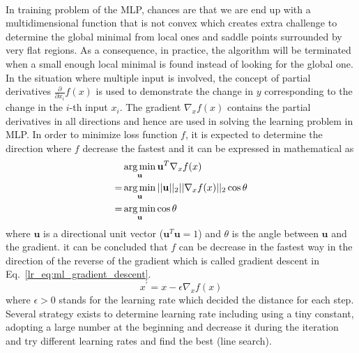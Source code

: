 \paragraph{}
In training problem of the MLP, chances are that we are end up with a multidimensional function that is not convex which creates extra challenge to determine the global minimal from local ones and saddle points surrounded by very flat regions.
As a consequence, in practice, the algorithm will be terminated when a small enough local minimal is found instead of looking for the global one.
In the situation where multiple input is involved, the concept of partial derivatives $\frac{\partial}{\partial x_i}f(x)$ is used to demonstrate the change in $y$ corresponding to the change in the $i$-th input $x_i$.
The gradient $\nabla_x f(x)$ contains the partial derivatives in all directions and hence are used in solving the learning problem in MLP.
In order to minimize loss function $f$, it is expected to determine the direction where $f$ decrease the fastest and it can be expressed in mathematical as
\begin{equation}
    \begin{aligned}
    & \operatorname*{arg\,min}_{\mathbf{u}} \mathbf{u}^T \nabla_x f(x)\\
    = & \operatorname*{arg\,min}_{\mathbf{u}} || \mathbf{u} ||_2 ||\nabla_xf(x)||_2 \cos\theta \\
    = & \operatorname*{arg\,min}_{\mathbf{u}} \cos\theta
    \end{aligned}
\end{equation}
%
where $\mathbf{u}$ is a directional unit vector ($\mathbf{u}^T\mathbf{u}=1$) and $\theta$ is the angle between $\mathbf{u}$ and the gradient.
it can be concluded that $f$ can be decrease in the fastest way in the direction of the reverse of the gradient which is called gradient descent in Eq.~\ref{lr_eq:ml_gradient_descent}.
\begin{equation}
    x^\prime = x - \epsilon \nabla_x f(x)
    \label{lr_eq:ml_gradient_descent}
\end{equation}
%
where $\epsilon > 0$ stands for the learning rate which decided the distance for each step.
Several strategy exists to determine learning rate including using a tiny constant, adopting a large number at the beginning and decrease it during the iteration and try different learning rates and find the best (line search).

